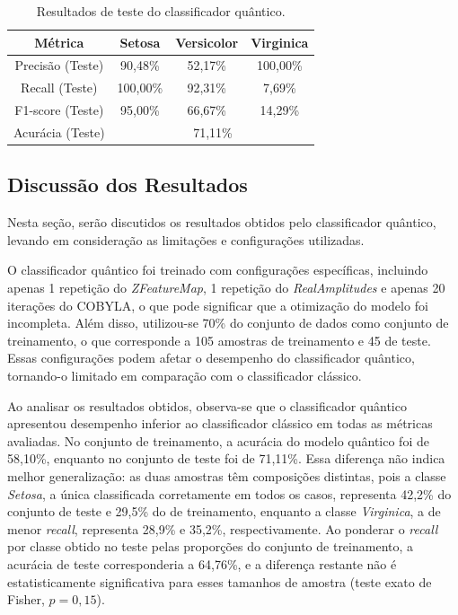 \begin{table}[H]
\centering
\caption{Resultados de teste do classificador quântico.}
\begin{tabular}{|c|c|c|c|}
\hline
\textbf{Métrica} & \textbf{Setosa} & \textbf{Versicolor} & \textbf{Virginica} \\ \hline
Precisão (Teste) & 90,48\% & 52,17\% & 100,00\% \\ \hline
Recall (Teste) & 100,00\% & 92,31\% & 7,69\% \\ \hline
F1-score (Teste) & 95,00\% & 66,67\% & 14,29\% \\ \hline
Acurácia (Teste) & \multicolumn{3}{|c|}{71,11\%} \\ \hline
\end{tabular}
\end{table}


\subsection{Discussão dos Resultados}

Nesta seção, serão discutidos os resultados obtidos pelo classificador quântico, levando em consideração as limitações e configurações utilizadas.

O classificador quântico foi treinado com configurações específicas, incluindo apenas 1 repetição do \textit{ZFeatureMap}, 1 repetição do \textit{RealAmplitudes} e apenas 20 iterações do COBYLA, o que pode significar que a otimização do modelo foi incompleta. Além disso, utilizou-se 70\% do conjunto de dados como conjunto de treinamento, o que corresponde a 105 amostras de treinamento e 45 de teste. Essas configurações podem afetar o desempenho do classificador quântico, tornando-o limitado em comparação com o classificador clássico.

Ao analisar os resultados obtidos, observa-se que o classificador quântico apresentou desempenho inferior ao classificador clássico em todas as métricas avaliadas. No conjunto de treinamento, a acurácia do modelo quântico foi de 58,10\%, enquanto no conjunto de teste foi de 71,11\%. Essa diferença não indica melhor generalização: as duas amostras têm composições distintas, pois a classe \textit{Setosa}, a única classificada corretamente em todos os casos, representa 42,2\% do conjunto de teste e 29,5\% do de treinamento, enquanto a classe \textit{Virginica}, a de menor \textit{recall}, representa 28,9\% e 35,2\%, respectivamente. Ao ponderar o \textit{recall} por classe obtido no teste pelas proporções do conjunto de treinamento, a acurácia de teste corresponderia a 64,76\%, e a diferença restante não é estatisticamente significativa para esses tamanhos de amostra (teste exato de Fisher, $p = 0{,}15$).


